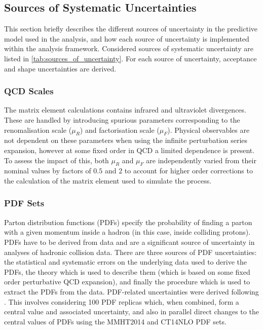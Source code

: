 \subsection{Sources of Systematic Uncertainties}\label{sec:sources_of_uncertainties}

This section briefly describes the different sources of uncertainty in the predictive model used in the analysis, and how each source of uncertainty is implemented within the analysis framework.
Considered sources of systematic uncertainty are listed in \cref{tab:sources_of_uncertainty}.
For each source of uncertainty, acceptance and shape uncertainties are derived.

\subsubsection{QCD Scales}

The \Vjets matrix element calculations contains infrared and ultraviolet divergences.
These are handled by introducing spurious parameters corresponding to the renomalisation scale ($\mu_R$) and factorisation scale ($\mu_F$).
Physical observables are not dependent on these parameters when using the infinite perturbation series expansion, however at some fixed order in QCD a limited dependence is present.
To assess the impact of this, both $\mu_R$ and $\mu_F$ are independently varied from their nominal values by factors of $0.5$ and $2$ to account for higher order corrections to the calculation of the matrix element used to simulate the process.

\subsubsection{PDF Sets}

Parton distribution functions (PDFs) specify the probability of finding a parton with a given momentum inside a hadron (in this case, inside colliding protons).
PDFs have to be derived from data and are a significant source of uncertainty in analyses of hadronic collision data.
There are three sources of PDF uncertainties: the statistical and systematic errors on the underlying data used to derive the PDFs, the theory which is used to describe them (which is based on some fixed order perturbative QCD expansion), and finally the procedure which is used to extract the PDFs from the data. 
PDF-related uncertainties were derived following .
This involves considering 100 PDF replicas which, when combined, form a central value and associated uncertainty, and also in parallel direct changes to the central values of PDFs using the MMHT2014 \cite{Harland-Lang:2014zoa} and CT14NLO \cite{Dulat:2015mca} PDF sets.

